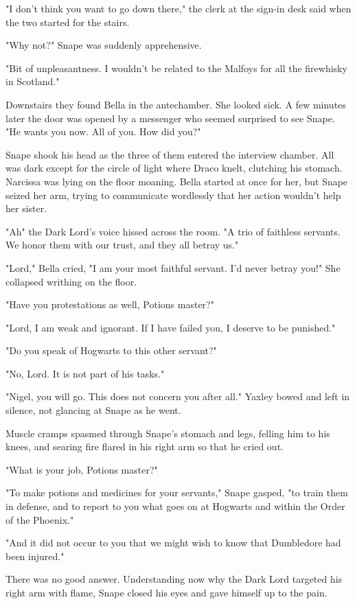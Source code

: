 "I don't think you want to go down there," the clerk at the sign-in desk said when the two started for the stairs.

"Why not?" Snape was suddenly apprehensive.

"Bit of unpleasantness. I wouldn't be related to the Malfoys for all the firewhisky in Scotland."

Downstairs they found Bella in the antechamber. She looked sick. A few minutes later the door was opened by a messenger who seemed surprised to see Snape. "He wants you now. All of you. How did you{\el}?"

Snape shook his head as the three of them entered the interview chamber. All was dark except for the circle of light where Draco knelt, clutching his stomach. Narcissa was lying on the floor moaning. Bella started at once for her, but Snape seized her arm, trying to communicate wordlessly that her action wouldn't help her sister.

"Ah{\el}" the Dark Lord's voice hissed across the room. "A trio of faithless servants. We honor them with our trust, and they all betray us."

"Lord," Bella cried, "I am your most faithful servant. I'd never betray you!" She collapsed writhing on the floor.

"Have you protestations as well, Potions master?"

"Lord, I am weak and ignorant. If I have failed you, I deserve to be punished."

"Do you speak of Hogwarts to this other servant?"

"No, Lord. It is not part of his tasks."

"Nigel, you will go. This does not concern you after all." Yaxley bowed and left in silence, not glancing at Snape as he went.

Muscle cramps spasmed through Snape's stomach and legs, felling him to his knees, and searing fire flared in his right arm so that he cried out.

"What is your job, Potions master?"

"To make potions and medicines for your servants," Snape gasped, "to train them in defense, and to report to you what goes on at Hogwarts and within the Order of the Phoenix."

"And it did not occur to you that we might wish to know that Dumbledore had been injured."

There was no good answer. Understanding now why the Dark Lord targeted his right arm with flame, Snape closed his eyes and gave himself up to the pain.


